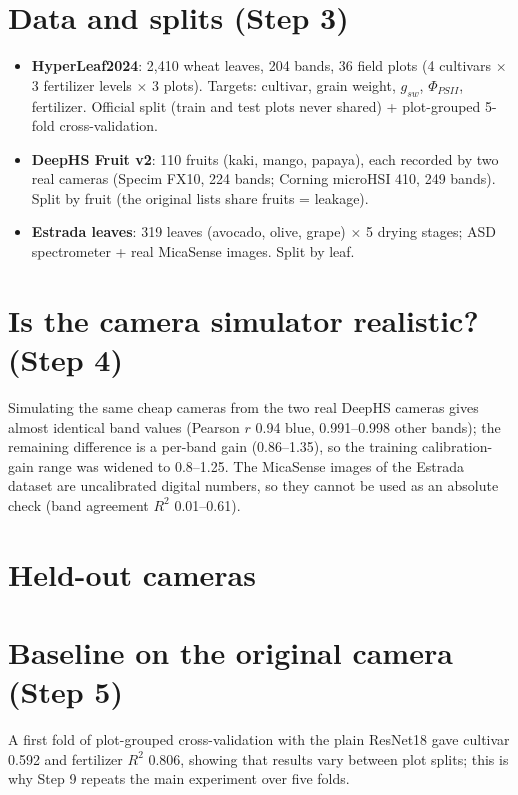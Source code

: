 \documentclass[11pt]{article}
\begin{document}
\section{Data and splits (Step 3)}
\begin{itemize}
\item \textbf{HyperLeaf2024}: 2,410 wheat leaves, 204 bands, 36 field plots (4 cultivars $\times$ 3 fertilizer levels
$\times$ 3 plots). Targets: cultivar, grain weight, $g_{sw}$, $\Phi_{PSII}$, fertilizer. Official split (train and test
plots never shared) + plot-grouped 5-fold cross-validation.
\item \textbf{DeepHS Fruit v2}: 110 fruits (kaki, mango, papaya), each recorded by two real cameras (Specim FX10, 224 bands;
Corning microHSI 410, 249 bands). Split by fruit (the original lists share fruits = leakage).
\item \textbf{Estrada leaves}: 319 leaves (avocado, olive, grape) $\times$ 5 drying stages; ASD spectrometer + real
MicaSense images. Split by leaf.
\end{itemize}

\section{Is the camera simulator realistic? (Step 4)}
Simulating the same cheap cameras from the two real DeepHS cameras gives almost identical band values
(Pearson $r$ 0.94 blue, 0.991--0.998 other bands); the remaining difference is a per-band gain (0.86--1.35), so the
training calibration-gain range was widened to 0.8--1.25. The MicaSense images of the Estrada dataset are uncalibrated
digital numbers, so they cannot be used as an absolute check (band agreement $R^2$ 0.01--0.61).

\section{Held-out cameras}
\begin{table}[H]\centering\small
\caption{The seven camera profiles used only for testing.}

\end{table}

\section{Baseline on the original camera (Step 5)}
\begin{table}[H]\centering\small
\caption{204-band models, official split. The ResNet18 with $2\times$ input and strong augmentation is the reference.}

\end{table}
A first fold of plot-grouped cross-validation with the plain ResNet18 gave cultivar 0.592 and fertilizer $R^2$ 0.806,
showing that results vary between plot splits; this is why Step 9 repeats the main experiment over five folds.
\end{document}
